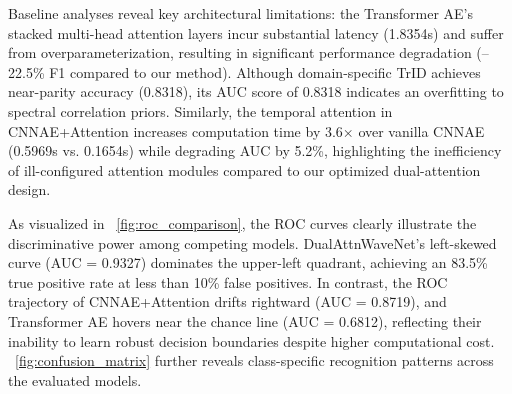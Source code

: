 \documentclass[conference]{IEEEtran}
\begin{document}
Baseline analyses reveal key architectural limitations: the Transformer AE's stacked multi-head attention layers incur substantial latency (1.8354s) and suffer from overparameterization, resulting in significant performance degradation (–22.5\% F1 compared to our method). Although domain-specific TrID achieves near-parity accuracy (0.8318), its AUC score of 0.8318 indicates an overfitting to spectral correlation priors. Similarly, the temporal attention in CNNAE+Attention increases computation time by 3.6× over vanilla CNNAE (0.5969s vs. 0.1654s) while degrading AUC by 5.2\%, highlighting the inefficiency of ill-configured attention modules compared to our optimized dual-attention design.

As visualized in \figurename~\ref{fig:roc_comparison}, the ROC curves clearly illustrate the discriminative power among competing models. DualAttnWaveNet's left-skewed curve (AUC = 0.9327) dominates the upper-left quadrant, achieving an 83.5\% true positive rate at less than 10\% false positives. In contrast, the ROC trajectory of CNNAE+Attention drifts rightward (AUC = 0.8719), and Transformer AE hovers near the chance line (AUC = 0.6812), reflecting their inability to learn robust decision boundaries despite higher computational cost. \figurename~\ref{fig:confusion_matrix} further reveals class-specific recognition patterns across the evaluated models.

\begin{table}[t]
    \caption{Performance Comparison of DualAttnWaveNet Against Baseline Models}
    \label{tab:main_results}
    \centering
\end{table}
\end{document}
